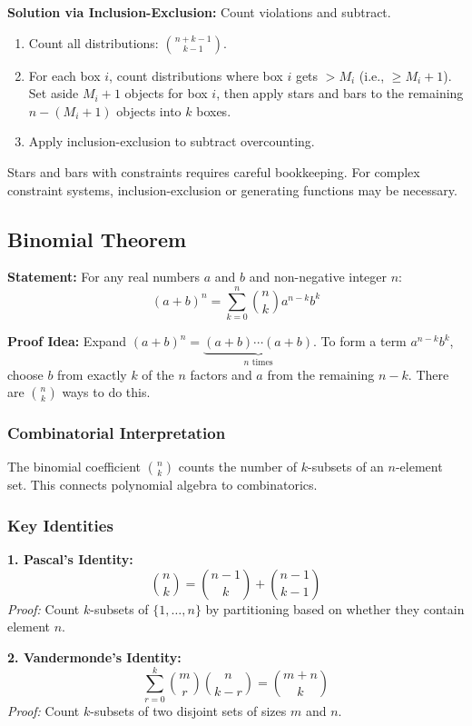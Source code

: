 \documentclass[12pt]{extarticle}
\begin{document}
\textbf{Solution via Inclusion-Exclusion:} Count violations and subtract.
\begin{enumerate}
    \item Count all distributions: $\binom{n+k-1}{k-1}$.
    \item For each box $i$, count distributions where box $i$ gets $> M_i$ (i.e., $\ge M_i+1$). Set aside $M_i+1$ objects for box $i$, then apply stars and bars to the remaining $n - (M_i+1)$ objects into $k$ boxes.
    \item Apply inclusion-exclusion to subtract overcounting.
\end{enumerate}

\begin{remarkbox}
Stars and bars with constraints requires careful bookkeeping. For complex constraint systems, inclusion-exclusion or generating functions may be necessary.
\end{remarkbox}

\subsection{Binomial Theorem}

\textbf{Statement:} For any real numbers $a$ and $b$ and non-negative integer $n$:
\[
(a+b)^n = \sum_{k=0}^{n} \binom{n}{k} a^{n-k} b^k
\]

\textbf{Proof Idea:} Expand $(a+b)^n = \underbrace{(a+b) \cdots (a+b)}_{n \text{ times}}$. To form a term $a^{n-k}b^k$, choose $b$ from exactly $k$ of the $n$ factors and $a$ from the remaining $n-k$. There are $\binom{n}{k}$ ways to do this.

\subsubsection{Combinatorial Interpretation}

The binomial coefficient $\binom{n}{k}$ counts the number of $k$-subsets of an $n$-element set. This connects polynomial algebra to combinatorics.

\subsubsection{Key Identities}

\textbf{1. Pascal's Identity:}
\[
\binom{n}{k} = \binom{n-1}{k} + \binom{n-1}{k-1}
\]
\textit{Proof:} Count $k$-subsets of $\{1, \ldots, n\}$ by partitioning based on whether they contain element $n$.

\textbf{2. Vandermonde's Identity:}
\[
\sum_{r=0}^{k} \binom{m}{r}\binom{n}{k-r} = \binom{m+n}{k}
\]
\textit{Proof:} Count $k$-subsets of two disjoint sets of sizes $m$ and $n$.
\end{document}
